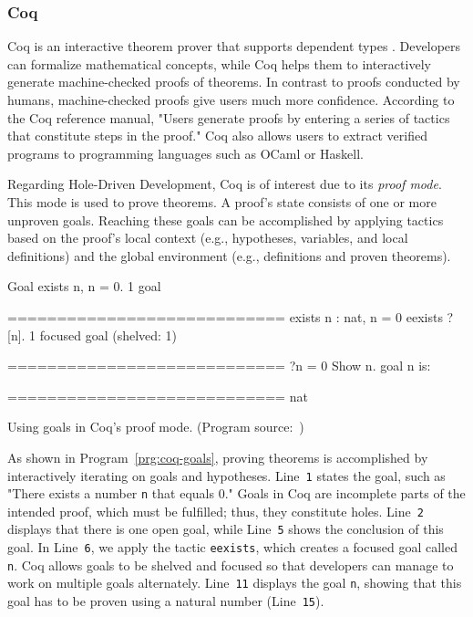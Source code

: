 \subsubsection{Coq}
Coq is an interactive theorem prover that supports dependent types \cite{the_coq_development_team_proof_2023}.
Developers can formalize mathematical concepts, while Coq helps them to interactively generate machine-checked proofs of theorems.
In contrast to proofs conducted by humans, machine-checked proofs give users much more confidence.
According to the Coq reference manual, "Users generate proofs by entering a series of tactics that constitute steps in the proof." \cite{the_coq_development_team_proof_2023}
Coq also allows users to extract verified programs to programming languages such as OCaml or Haskell.

Regarding Hole-Driven Development, Coq is of interest due to its \emph{proof mode}.
This mode is used to prove theorems.
A proof's state consists of one or more unproven goals.
Reaching these goals can be accomplished by applying tactics \cite{redmon_coq_2021} based on the proof's local context (e.g., hypotheses, variables, and local definitions) and the global environment (e.g., definitions and proven theorems).

\begin{program}[ht]
\begin{GenericCode}
Goal exists n, n = 0.
    1 goal
      
      ============================
      exists n : nat, n = 0
eexists ?[n].
    1 focused goal (shelved: 1)
      
      ============================
      ?n = 0
Show n.
    goal n is:
      
      ============================
      nat
\end{GenericCode}
\caption{Using goals in Coq's proof mode. (Program source:~\cite{the_coq_development_team_proof_2023})}
\label{prg:coq-goals}
\end{program}

As shown in Program~\ref{prg:coq-goals}, proving theorems is accomplished by interactively iterating on goals and hypotheses.
Line~\verb|1| states the goal, such as "There exists a number \verb|n| that equals 0."
Goals in Coq are incomplete parts of the intended proof, which must be fulfilled; thus, they constitute holes.
Line~\verb|2| displays that there is one open goal, while Line~\verb|5| shows the conclusion of this goal.
In Line~\verb|6|, we apply the tactic \verb|eexists|, which creates a focused goal called \verb|n|.
Coq allows goals to be shelved and focused so that developers can manage to work on multiple goals alternately.
Line~\verb|11| displays the goal \verb|n|, showing that this goal has to be proven using a natural number (Line~\verb|15|).

